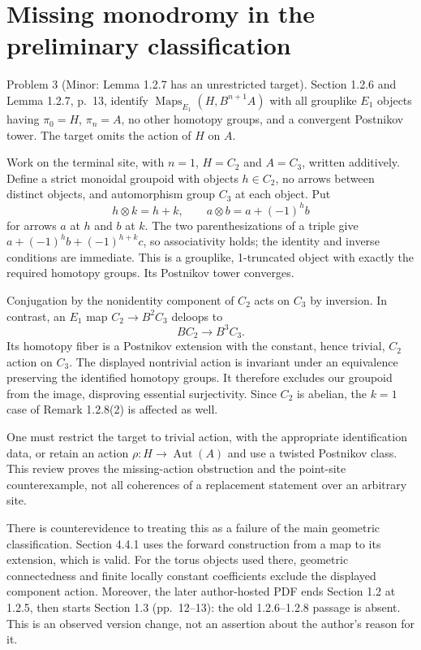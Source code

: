 \documentclass[10pt]{article}
\begin{document}
\section*{Missing monodromy in the preliminary classification}
Problem 3 (Minor: Lemma 1.2.7 has an unrestricted target).  Section 1.2.6 and Lemma 1.2.7, p. 13, identify \(\operatorname{Maps}_{E_1}(H,B^{n+1}A)\) with all grouplike \(E_1\) objects having \(\pi_0=H\), \(\pi_n=A\), no other homotopy groups, and a convergent Postnikov tower. The target omits the action of \(H\) on \(A\).\par
Work on the terminal site, with \(n=1\), \(H=C_2\) and \(A=C_3\), written additively. Define a strict monoidal groupoid with objects \(h\in C_2\), no arrows between distinct objects, and automorphism group \(C_3\) at each object. Put \[h\otimes k=h+k,\qquad
 a\otimes b=a+(-1)^h b\] for arrows \(a\) at \(h\) and \(b\) at \(k\). The two parenthesizations of a triple give \(a+(-1)^h b+(-1)^{h+k}c\), so associativity holds; the identity and inverse conditions are immediate. This is a grouplike, 1-truncated object with exactly the required homotopy groups. Its Postnikov tower converges.\par
Conjugation by the nonidentity component of \(C_2\) acts on \(C_3\) by inversion. In contrast, an \(E_1\) map \(C_2\to B^2C_3\) deloops to \[BC_2\longrightarrow B^3C_3.\] Its homotopy fiber is a Postnikov extension with the constant, hence trivial, \(C_2\) action on \(C_3\). The displayed nontrivial action is invariant under an equivalence preserving the identified homotopy groups. It therefore excludes our groupoid from the image, disproving essential surjectivity. Since \(C_2\) is abelian, the \(k=1\) case of Remark 1.2.8(2) is affected as well.\par
One must restrict the target to trivial action, with the appropriate identification data, or retain an action \(\rho:H\to\operatorname{Aut}(A)\) and use a twisted Postnikov class. This review proves the missing-action obstruction and the point-site counterexample, not all coherences of a replacement statement over an arbitrary site.\par
There is counterevidence to treating this as a failure of the main geometric classification. Section 4.4.1 uses the forward construction from a map to its extension, which is valid. For the torus objects used there, geometric connectedness and finite locally constant coefficients exclude the displayed component action. Moreover, the later author-hosted PDF ends Section 1.2 at 1.2.5, then starts Section 1.3 (pp. 12–13): the old 1.2.6–1.2.8 passage is absent. This is an observed version change, not an assertion about the author’s reason for it.\par
\end{document}
